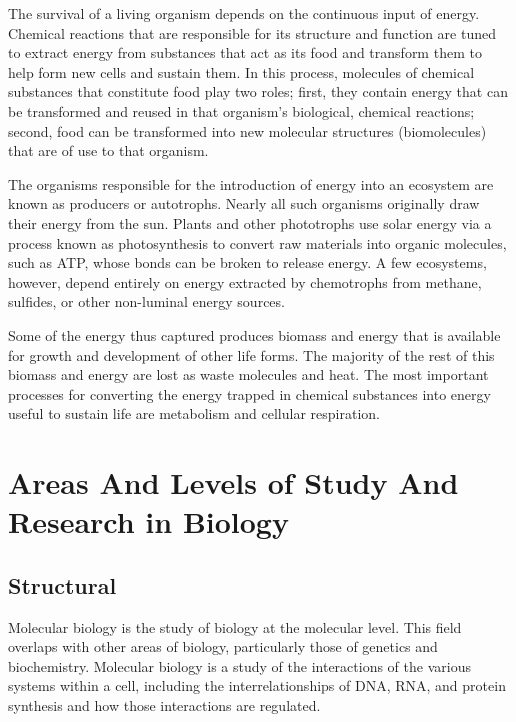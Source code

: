 \documentclass[
]{book}
\begin{document}
The survival of a living organism depends on the continuous input of energy. Chemical reactions that are responsible for its structure and function are tuned to extract energy from substances that act as its food and transform them to help form new cells and sustain them. In this process, molecules of chemical substances that constitute food play two roles; first, they contain energy that can be transformed and reused in that organism's biological, chemical reactions; second, food can be transformed into new molecular structures (biomolecules) that are of use to that organism.

The organisms responsible for the introduction of energy into an ecosystem are known as producers or autotrophs. Nearly all such organisms originally draw their energy from the sun. Plants and other phototrophs use solar energy via a process known as photosynthesis to convert raw materials into organic molecules, such as ATP, whose bonds can be broken to release energy. A few ecosystems, however, depend entirely on energy extracted by chemotrophs from methane, sulfides, or other non-luminal energy sources.

Some of the energy thus captured produces biomass and energy that is available for growth and development of other life forms. The majority of the rest of this biomass and energy are lost as waste molecules and heat. The most important processes for converting the energy trapped in chemical substances into energy useful to sustain life are metabolism and cellular respiration.

\hypertarget{areas-and-levels-of-study-and-research-in-biology}{%
\section{Areas And Levels of Study And Research in Biology}\label{areas-and-levels-of-study-and-research-in-biology}}

\hypertarget{structural}{%
\subsection{Structural}\label{structural}}

Molecular biology is the study of biology at the molecular level. This field overlaps with other areas of biology, particularly those of genetics and biochemistry. Molecular biology is a study of the interactions of the various systems within a cell, including the interrelationships of DNA, RNA, and protein synthesis and how those interactions are regulated.
\end{document}
